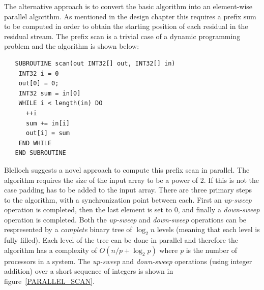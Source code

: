   The alternative approach is to convert the basic algorithm into an element-wise parallel algorithm. As mentioned in the design chapter this requires a prefix sum to be computed 
  in order to obtain the starting position of each residual in the residual stream. The prefix scan is a trivial case of a dynamic programming problem and the algorithm 
  \cite{blelloch1990prefix} is shown below:
  \begin{verbatim}
   SUBROUTINE scan(out INT32[] out, INT32[] in)
    INT32 i = 0
    out[0] = 0;
    INT32 sum = in[0]
    WHILE i < length(in) DO
      ++i
      sum += in[i]
      out[i] = sum
    END WHILE
   END SUBROUTINE
  \end{verbatim}
  Blelloch suggests a novel approach \cite{blelloch1990prefix} to compute this prefix scan in parallel. The algorithm requires the size of the input array to
  be a power of 2. If this is not the case padding has to be added to the input array. There are three primary steps to the algorithm, with a synchronization point between each. First
  an \textit{up-sweep} operation is completed, then the last element is set to 0, and finally a \textit{down-sweep} operation is completed. Both the \textit{up-sweep} and \textit{down-sweep} operations
  can be respresented by a \textit{complete} binary tree of $\log_2n$ levels (meaning that each level is fully filled). Each level of the tree can be done in parallel and therefore the algorithm has a 
  complexity of $O(n/p + \log_2{p})$ where \textit{p} is the number of processors in a system. The \textit{up-sweep} and \textit{down-sweep} operations (using integer addition) over a short sequence of integers is shown
  in figure~\ref{PARALLEL_SCAN}.
